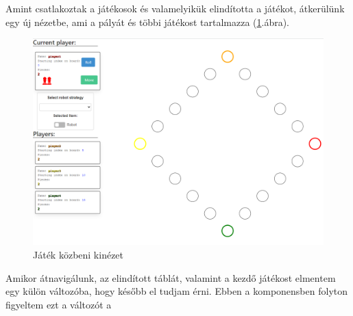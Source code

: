 \documentclass[a4paper,twoside]{article}
\begin{document}
Amint csatlakoztak a játékosok és valamelyikük elindította a játékot, átkerülünk egy új nézetbe, ami a pályát és többi játékost tartalmazza (\ref{playingboard}.ábra).
\begin{figure}
	\caption{Játék közbeni kinézet}
	\label{playingboard}
	\centering
	\includegraphics[scale=0.35]{playingboard}
\end{figure}
\FloatBarrier
Amikor átnavigálunk, az elindított táblát, valamint a kezdő játékost elmentem egy külön változóba, hogy később el tudjam érni. Ebben  a komponensben folyton figyeltem ezt a változót a
\end{document}
